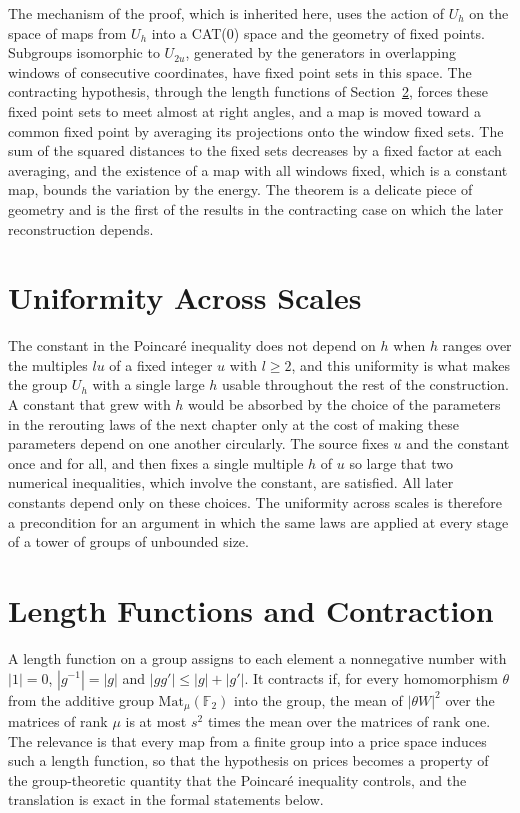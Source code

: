 \documentclass[11pt,letterpaper]{report}
\theoremstyle{plain}
\theoremstyle{definition}
\theoremstyle{remark}
\begin{document}
The mechanism of the proof, which is inherited here, uses the action of $U_h$ on the space of maps from $U_h$ into a CAT(0) space and the geometry of fixed points. Subgroups isomorphic to $U_{2u}$, generated by the generators in overlapping windows of consecutive coordinates, have fixed point sets in this space. The contracting hypothesis, through the length functions of Section~\ref{sec:lengthfn}, forces these fixed point sets to meet almost at right angles, and a map is moved toward a common fixed point by averaging its projections onto the window fixed sets. The sum of the squared distances to the fixed sets decreases by a fixed factor at each averaging, and the existence of a map with all windows fixed, which is a constant map, bounds the variation by the energy. The theorem is a delicate piece of geometry and is the first of the results in the contracting case on which the later reconstruction depends.

\section{Uniformity Across Scales}

The constant in the Poincar\'e inequality does not depend on $h$ when $h$ ranges over the multiples $lu$ of a fixed integer $u$ with $l\ge2$, and this uniformity is what makes the group $U_h$ with a single large $h$ usable throughout the rest of the construction. A constant that grew with $h$ would be absorbed by the choice of the parameters in the rerouting laws of the next chapter only at the cost of making these parameters depend on one another circularly. The source fixes $u$ and the constant once and for all, and then fixes a single multiple $h$ of $u$ so large that two numerical inequalities, which involve the constant, are satisfied. All later constants depend only on these choices. The uniformity across scales is therefore a precondition for an argument in which the same laws are applied at every stage of a tower of groups of unbounded size.

\section{Length Functions and Contraction}\label{sec:lengthfn}

A length function on a group assigns to each element a nonnegative number with $|1|=0$, $|g^{-1}|=|g|$ and $|gg'|\le|g|+|g'|$. It contracts if, for every homomorphism $\theta$ from the additive group $\mathrm{Mat}_\mu(\mathbb F_2)$ into the group, the mean of $|\theta W|^2$ over the matrices of rank $\mu$ is at most $s^2$ times the mean over the matrices of rank one. The relevance is that every map from a finite group into a price space induces such a length function, so that the hypothesis on prices becomes a property of the group-theoretic quantity that the Poincar\'e inequality controls, and the translation is exact in the formal statements below.
\end{document}
